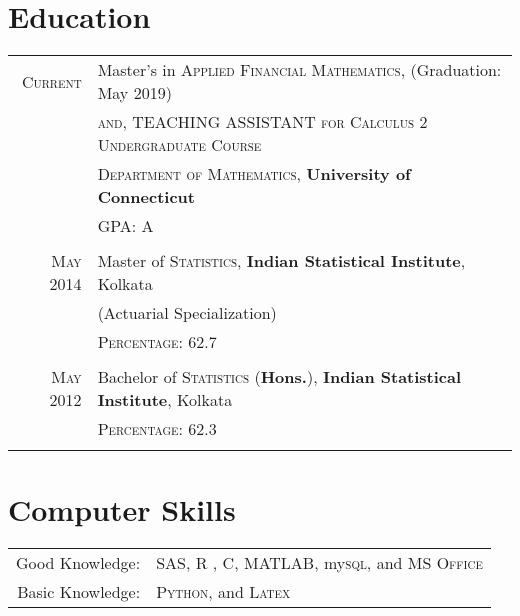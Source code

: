 \documentclass[a4paper,10pt]{article}
\begin{document}
\section{Education}
\begin{tabular}{rl}	
 \textsc{Current}  & Master's in \textsc{Applied Financial Mathematics}, (Graduation: May 2019) \\
 & \textsc{and, TEACHING ASSISTANT for Calculus 2 Undergraduate Course} \\
 & \textsc{Department of Mathematics}, \textbf{University of Connecticut} \\
&\normalsize \textsc{GPA}: A \\&\\
 \textsc{May} 2014 & Master of \textsc{Statistics}, \textbf{Indian Statistical Institute}, Kolkata\\
 & (Actuarial Specialization) \\
&\normalsize \textsc{Percentage}: 62.7 \\&\\
\textsc{May} 2012 & Bachelor of \textsc{Statistics} (\textbf{Hons.}), \textbf{Indian Statistical Institute}, Kolkata\\ 
&\normalsize \textsc{Percentage}: 62.3 \\&\\

\end{tabular}

\section{Computer Skills}
\begin{tabular}{rl}
 Good Knowledge:& \textsc{SAS}, \textsc{R} , \textsc{C},  \textsc{MATLAB}, my\textsc{sql}, and \textsc{MS Office} \setmainfont[SmallCapsFont=Fontin-SmallCaps.otf]{Fontin.otf}\\

Basic Knowledge:& \textsc{Python}, and \textsc{Latex}\\
\end{tabular}




\end{document}
